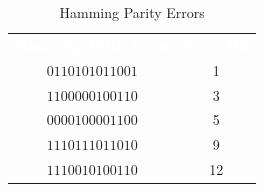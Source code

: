 \begin{table}[H]
  \sffamily
  \newcommand{\head}[1]{\textcolor{white}{\textbf{#1}}}    
  \begin{center}
    \begin{tabular}{cc} 
      \rowcolor{black!75}
      \head{Hamming With Error} & \head{Error Bit} \\
      $ 0110101011001 $ & 1 \\
      $ 1100000100110 $ & 3 \\
      $ 0000100001100 $ & 5 \\
      $ 1110111011010 $ & 9 \\
      $ 1110010100110 $ & 12 \\
    \end{tabular}
  \end{center}
  \caption{Hamming Parity Errors}
  \label{CL:tab:hamming_parity_errors}
\end{table}
